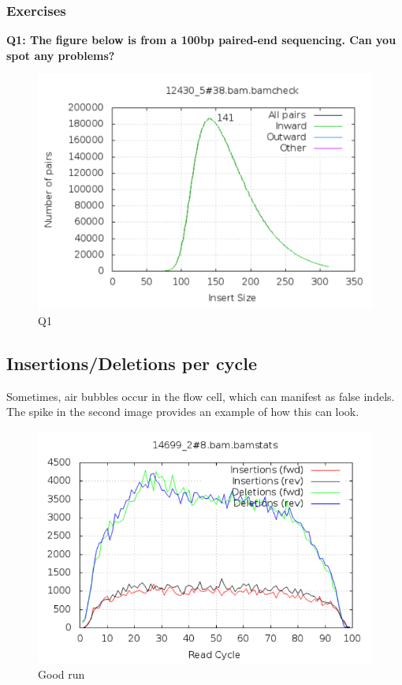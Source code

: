 \documentclass[11pt]{article}
\makeatletter
\def\maxwidth{\ifdim\Gin@nat@width>\linewidth\linewidth
    \else\Gin@nat@width\fi}
\let\Oldincludegraphics\includegraphics
\renewcommand{\includegraphics}[1]{\Oldincludegraphics[width=.8\maxwidth, height=.55\textheight, keepaspectratio]{#1}}
\makeatother
\begin{document}
\newpage


    \hypertarget{exercises}{%
\subsubsection{Exercises}\label{exercises}}

\textbf{Q1: The figure below is from a 100bp paired-end sequencing. Can
you spot any problems?}

    \begin{figure}[H]
\centering
\includegraphics{img/insert_size_quiz.png}
\caption{Q1}
\end{figure}

    \hypertarget{insertionsdeletions-per-cycle}{%
\subsection{Insertions/Deletions per
cycle}\label{insertionsdeletions-per-cycle}}

Sometimes, air bubbles occur in the flow cell, which can manifest as
false indels. The spike in the second image provides an example of how
this can look.

    \begin{figure}[H]
\centering
\includegraphics{img/indels-per-cycle.pass.png}
\caption{Good run}
\end{figure}
\end{document}
